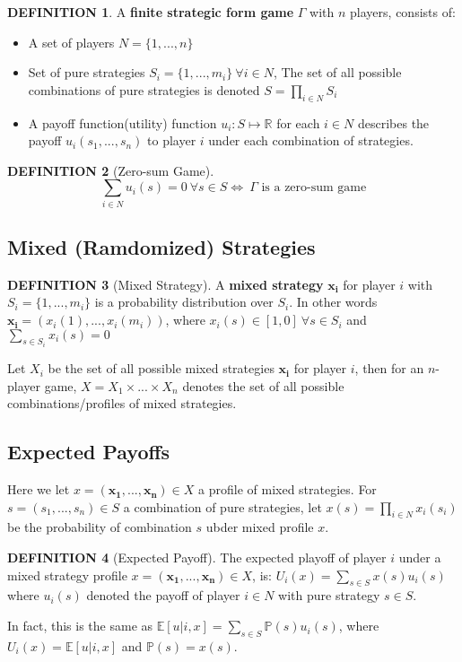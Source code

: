 \documentclass[12pt]{article}
\theoremstyle{definition}
\newtheorem*{definition}{DEFINITION}
\newcommand{\Prob}[1]{\mathbb{P}(#1)}
\newcommand{\Expect}[1]{\mathbb{E}\left[#1\right]}
\begin{document}
    \begin{definition}
        A \textbf{finite strategic form game} $\Gamma$ with $n$ players, consists of:
            \begin{itemize}
                \item A set of players $N = \{1,...,n\}$
                \item Set of pure strategies $S_i = \{1,...,m_i\} \ \forall i \in N$, The set of all possible combinations of pure strategies is denoted $S = \prod_{i\in N}S_i$
                \item A payoff function(utility) function $u_i:S\mapsto\mathbb{R}$ for each $i \in N$ describes the payoff $u_i(s_1,...,s_n)$ to player $i$ under each combination of strategies.
            \end{itemize}
    \end{definition}

    \begin{definition}[Zero-sum Game]
        $$\sum_{i \in N} u_i(s) = 0 \ \forall s \in S \Leftrightarrow \ \Gamma\text{ is a zero-sum game}$$
    \end{definition}

    \subsection*{Mixed (Ramdomized) Strategies}
        \begin{definition}[Mixed Strategy]
            A \textbf{mixed strategy} $\bm{x_i}$ for player $i$ with $S_i = \{1,...,m_i\}$ is a probability distribution over $S_i$. In other words $\bm{x_i} = \left(x_i(1),...,x_i(m_i)\right)$, where $x_i(s) \in [1,0] \ \forall s \in S_i$ and $\sum_{s\in S_i}{x_i(s)} = 0$
        \end{definition}
        
        Let $X_i$ be the set of all possible mixed strategies $\bm{x_i}$ for player $i$, then for an $n$-player game, $X = X_1 \times ... \times X_n$ denotes the set of all possible combinations/profiles of mixed strategies.

    \subsection*{Expected Payoffs}
        Here we let $x = (\bm{x_1},...,\bm{x_n}) \in X$ a profile of mixed strategies. For $s = (s_1,...,s_n) \in S$ a combination of pure strategies, let $x(s) = \prod_{i \in N}x_i(s_i)$ be the probability of combination $s$ ubder mixed profile $x$.
        \begin{definition}[Expected Payoff]
            The expected playoff of player $i$ under a mixed strategy profile $x = (\bm{x_1},...,\bm{x_n}) \in X$, is: $U_i(x) = \sum_{s \in S}x(s)u_i(s)$ where $u_i(s)$ denoted the payoff of player $i\in N$ with pure strategy $s \in S$.
        \end{definition}
        In fact, this is the same as $\Expect{u|i,x} = \sum_{s \in S}\Prob{s}u_i(s)$, where $U_i(x) = \Expect{u|i,x}$ and $\Prob{s} = x(s)$.
    
\end{document}
